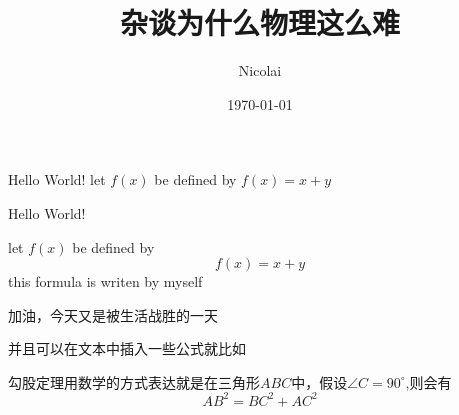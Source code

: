 \documentclass{article} %
\title{\heiti 杂谈为什么物理这么难}
\author{Nicolai}
\date{\today}
\newcommand\degree{^\circ}
\begin{document}
    \maketitle    
    Hello World!
    let $f(x)$ be defined by $f(x) = x + y$

    Hello World!

    let $f(x)$ be defined by $$f(x) = x + y$$ this formula is writen by myself
    
    加油，今天又是被生活战胜的一天
    
    并且可以在文本中插入一些公式就比如

    勾股定理用数学的方式表达就是在三角形$ABC$中，假设$\angle C=90\degree$,则会有
    \begin{equation}
        AB^2 = BC^2 + AC^2
    \end{equation}
\end{document}
